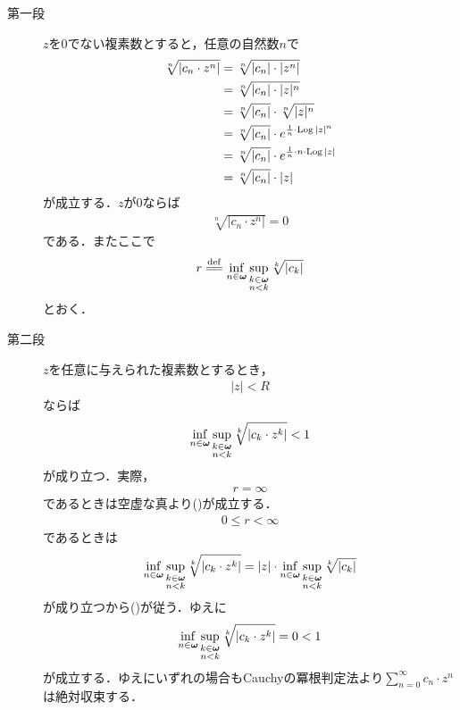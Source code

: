 	\begin{sketch}\mbox{}
		\begin{description}
			\item[第一段]
				$z$を$0$でない複素数とすると，任意の自然数$n$で
				\begin{align}
					\sqrt[n]{|c_{n} \cdot z^{n}|}
					&= \sqrt[n]{|c_{n}| \cdot |z^{n}|} \\
					&= \sqrt[n]{|c_{n}| \cdot |z|^{n}} \\
					&= \sqrt[n]{|c_{n}|} \cdot \sqrt[n]{|z|^{n}} \\
					&= \sqrt[n]{|c_{n}|} \cdot e^{\frac{1}{n} \cdot \operatorname{Log}{|z|^{n}}} \\
					&= \sqrt[n]{|c_{n}|} \cdot e^{\frac{1}{n} \cdot n \cdot \operatorname{Log}{|z|}} \\
					&= \sqrt[n]{|c_{n}|} \cdot |z|
				\end{align}
				が成立する．$z$が$0$ならば
				\begin{align}
					\sqrt[n]{|c_{n} \cdot z^{n}|} = 0
				\end{align}
				である．またここで
				\begin{align}
					r \defeq \inf{n \in \Natural}{\sup{\substack{k \in \Natural \\ n < k}}{\sqrt[k]{|c_{k}|}}}
				\end{align}
				とおく．
				
			\item[第二段]
				$z$を任意に与えられた複素数とするとき，
				\begin{align}
					|z| < R
				\end{align}
				ならば
				\begin{align}
					\operatorname*{inf}_{n \in {\boldsymbol \omega}} \operatorname*{sup}_{\substack{k \in {\boldsymbol \omega} \\ n < k}} \sqrt[k]{|c_{k} \cdot z^{k}|} < 1
					\label{fom:thm_radius_of_convergence_1}
				\end{align}
				が成り立つ．実際，
				\begin{align}
					r = \infty
				\end{align}
				であるときは空虚な真より()が成立する．
				\begin{align}
					0 \leq r < \infty
				\end{align}
				であるときは
				\begin{align}
					\operatorname*{inf}_{n \in {\boldsymbol \omega}} \operatorname*{sup}_{\substack{k \in {\boldsymbol \omega} \\ n < k}} \sqrt[k]{|c_{k} \cdot z^{k}|}
					= |z| \cdot \operatorname*{inf}_{n \in {\boldsymbol \omega}} \operatorname*{sup}_{\substack{k \in {\boldsymbol \omega} \\ n < k}} \sqrt[k]{|c_{k}|}
				\end{align}
				が成り立つから()が従う．ゆえに
				\begin{align}
					\operatorname*{inf}_{n \in {\boldsymbol \omega}} \operatorname*{sup}_{\substack{k \in {\boldsymbol \omega} \\ n < k}} \sqrt[k]{|c_{k} \cdot z^{k}|}
					= 0 < 1
				\end{align}
				が成立する．ゆえにいずれの場合もCauchyの冪根判定法より$\sum_{n=0}^{\infty} c_n \cdot z^n$は絶対収束する．
		

\end{description}
\end{sketch}
